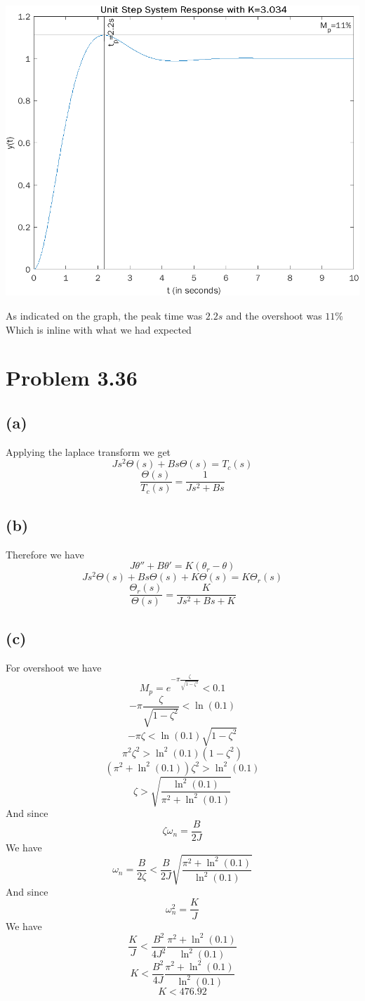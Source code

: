 \documentclass[12pt]{article}
\begin{document}
\includegraphics[scale=.5]{Fig1.png}

As indicated on the graph, the peak time was $2.2s$ and the overshoot was $11\%$
Which is inline with what we had expected
\section*{Problem 3.36}
\subsection*{(a)}
Applying the laplace transform we get
$$Js^2\Theta(s)+Bs\Theta(s)=T_c(s)$$
$$\frac{\Theta(s)}{T_c(s)}=\boxed{\frac{1}{Js^2+Bs}}$$
\subsection*{(b)}
Therefore we have
$$J\theta''+B\theta'=K(\theta_r-\theta)$$
$$Js^2\Theta(s)+Bs\Theta(s)+K\Theta(s)=K\Theta_r(s)$$
$$\frac{\Theta_r(s)}{\Theta(s)}=\boxed{\frac{K}{Js^2+Bs+K}}$$
\subsection*{(c)}
For overshoot we have
$$M_p=e^{-\pi\frac{\zeta}{\sqrt{1-\zeta^2}}}<0.1$$
$$-\pi\frac{\zeta}{\sqrt{1-\zeta^2}}<\ln(0.1)$$
$$-\pi\zeta<\ln(0.1)\sqrt{1-\zeta^2}$$
$$\pi^2\zeta^2>\ln^2(0.1)(1-\zeta^2)$$
$$(\pi^2+\ln^2(0.1))\zeta^2>\ln^2(0.1)$$
$$\zeta>\sqrt{\frac{\ln^2(0.1)}{\pi^2+\ln^2(0.1)}}$$
And since 
$$\zeta\omega_n=\frac{B}{2J}$$
We have
$$\omega_n=\frac{B}{2\zeta}<\frac{B}{2J}\sqrt{\frac{\pi^2+\ln^2(0.1)}{\ln^2(0.1)}}$$
And since
$$\omega_n^2=\frac{K}{J}$$
We have
$$\frac{K}{J}<\frac{B^2}{4J^2}\frac{\pi^2+\ln^2(0.1)}{\ln^2(0.1)}$$
$$K<\frac{B^2}{4J}\frac{\pi^2+\ln^2(0.1)}{\ln^2(0.1)}$$
$$K<\boxed{476.92}$$
\end{document}

